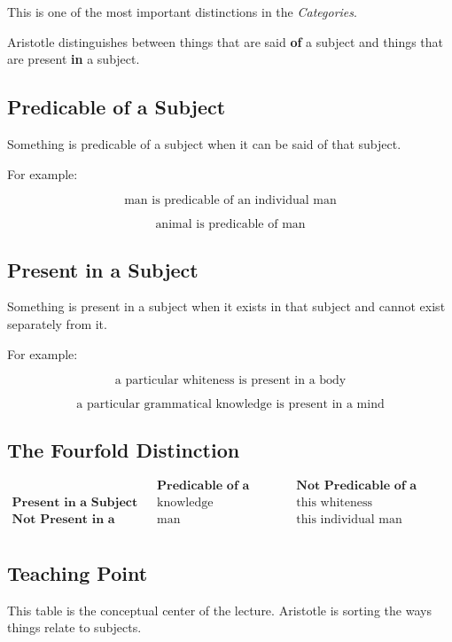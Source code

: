 \documentclass[12pt]{article}
\begin{document}
This is one of the most important distinctions in the \textit{Categories}.

Aristotle distinguishes between things that are said \textbf{of} a subject and
things that are present \textbf{in} a subject.

\subsection*{Predicable of a Subject}

Something is predicable of a subject when it can be said of that subject.

For example:

\[
\text{man is predicable of an individual man}
\]

\[
\text{animal is predicable of man}
\]

\subsection*{Present in a Subject}

Something is present in a subject when it exists in that subject and cannot
exist separately from it.

For example:

\[
\text{a particular whiteness is present in a body}
\]

\[
\text{a particular grammatical knowledge is present in a mind}
\]

\subsection*{The Fourfold Distinction}

\[
\begin{array}{c|c|c}
 & \textbf{Predicable of a Subject} & \textbf{Not Predicable of a Subject} \\
\hline
\textbf{Present in a Subject} &
\text{knowledge} &
\text{this whiteness} \\
\hline
\textbf{Not Present in a Subject} &
\text{man} &
\text{this individual man} \\
\end{array}
\]

\subsection*{Teaching Point}

This table is the conceptual center of the lecture. Aristotle is sorting the
ways things relate to subjects.
\end{document}
